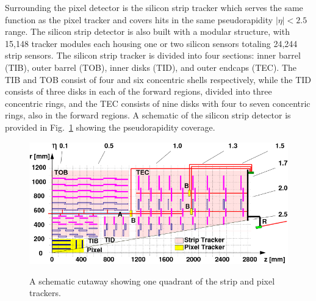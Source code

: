 Surrounding the pixel detector is the silicon strip tracker \cite{SiliconStrip} which serves the same function as the pixel tracker and covers hits in the same pseudorapidity $|\eta|<2.5$ range. The silicon strip detector is also built with a modular structure, with 15,148 tracker modules each housing one or two silicon sensors totaling 24,244 strip sensors. The silicon strip tracker is divided into four sections: inner barrel (TIB), outer barrel (TOB), inner disks (TID), and outer endcaps (TEC). The TIB and TOB consist of four and six concentric shells respectively, while the TID consists of three disks in each of the forward regions, divided into three concentric rings, and the TEC consists of nine disks with four to seven concentric rings, also in the forward regions. A schematic of the silicon strip detector is provided in Fig.~\ref{fig:StripDiagram} showing the pseudorapidity coverage.

\begin{figure}[H]
    \centering
    {\includegraphics[width=\textwidth]{Images/CMS/TrackerQuadrant.png}}
    \caption{A schematic cutaway showing one quadrant of the strip and pixel trackers.}
    \label{fig:StripDiagram}
\end{figure}